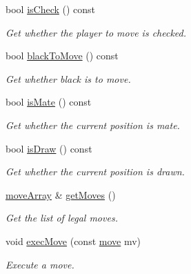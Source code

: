 \begin{DoxyCompactItemize}
\mbox{\label{classBoard_a58ee677360099107d0d33becdc2af888}} 
bool \hyperlink{classBoard_a58ee677360099107d0d33becdc2af888}{is\+Check} () const
\begin{DoxyCompactList}\small\item\em Get whether the player to move is checked. \end{DoxyCompactList}\item 
\mbox{\label{classBoard_a78089ae51f1e8e02dfec7c739f3ca74a}} 
bool \hyperlink{classBoard_a78089ae51f1e8e02dfec7c739f3ca74a}{black\+To\+Move} () const
\begin{DoxyCompactList}\small\item\em Get whether black is to move. \end{DoxyCompactList}\item 
\mbox{\label{classBoard_adfdc9dd19eb4119b6926a70c89db7d31}} 
bool \hyperlink{classBoard_adfdc9dd19eb4119b6926a70c89db7d31}{is\+Mate} () const
\begin{DoxyCompactList}\small\item\em Get whether the current position is mate. \end{DoxyCompactList}\item 
\mbox{\label{classBoard_a6a9553957873a05f9cca67f8f0677b74}} 
bool \hyperlink{classBoard_a6a9553957873a05f9cca67f8f0677b74}{is\+Draw} () const
\begin{DoxyCompactList}\small\item\em Get whether the current position is drawn. \end{DoxyCompactList}\item 
\mbox{\label{classBoard_a993b2839790b3fbe4b1c6ba2a2257fe1}} 
\hyperlink{structmoveArray}{move\+Array} \& \hyperlink{classBoard_a993b2839790b3fbe4b1c6ba2a2257fe1}{get\+Moves} ()
\begin{DoxyCompactList}\small\item\em Get the list of legal moves. \end{DoxyCompactList}\item 
void \hyperlink{classBoard_a5732564ae8ce7f247072ded83f71dc75}{exec\+Move} (const \hyperlink{structmove}{move} mv)
\begin{DoxyCompactList}\small\item\em Execute a move. \end{DoxyCompactList}\item 

\end{DoxyCompactItemize}

